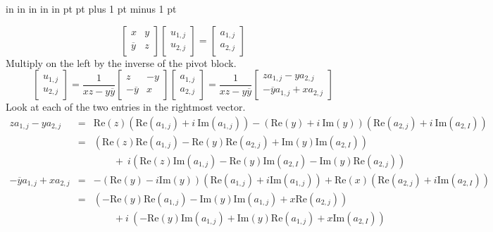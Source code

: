 %
%

 in
 in
 in
 in
 in
 pt
 pt plus 1 pt minus 1 pt

\newcommand{\bnd}{{\partial}}
\renewcommand{\Re}{{\mbox{Re}}}
\renewcommand{\Im}{{\mbox{Im}}}



\makeindex



$$
\left \lbrack \begin{array}{cc}
x & y \\
\overline{y} & z
\end{array} \right \rbrack
\left \lbrack \begin{array}{c}
u_{1,j} \\
u_{2,j}
\end{array} \right \rbrack
=
\left \lbrack \begin{array}{c}
a_{1,j} \\
a_{2,j}
\end{array} \right \rbrack
$$
Multiply on the left by the inverse of the pivot block.
$$
\left \lbrack \begin{array}{c}
u_{1,j} \\
u_{2,j}
\end{array} \right \rbrack
=
\frac{1}{xz - y\overline{y}}
\left \lbrack \begin{array}{cc}
z & -y \\
-\overline{y} & x
\end{array} \right \rbrack
\left \lbrack \begin{array}{c}
a_{1,j} \\
a_{2,j}
\end{array} \right \rbrack
=
\frac{1}{xz - y\overline{y}}
\left \lbrack \begin{array}{c}
z a_{1,j} - y a_{2,j} \\
- \overline{y} a_{1,j} + x a_{2,j}
\end{array} \right \rbrack
$$
Look at each of the two entries in the rightmost vector.
\begin{eqnarray*}
z a_{1,j} - y a_{2,j} 
& = & 
\Re(z) ( \Re(a_{1,j}) + i\  \Im(a_{1,j}) )
- ( \Re(y) + i\  \Im(y) )( \Re(a_{2,j}) + i\  \Im(a_{2,I}) )
\\
& = & 
( 
\Re(z) \Re(a_{1,j}) - \Re(y) \Re(a_{2,j}) + \Im(y) \Im(a_{2,I}) 
) \\
& & 
\qquad +\  i( 
\Re(z) \Im(a_{1,j}) - \Re(y) \Im(a_{2,I}) - \Im(y) \Re(a_{2,j})
)
\\
- \overline{y} a_{1,j} + x a_{2,j} 
& = &
-( \Re(y) - i \Im(y) ) ( \Re(a_{1,j}) + i \Im(a_{1,j}) )
+ \Re(x) ( \Re(a_{2,j}) + i \Im(a_{2,I}) )
\\
& = & 
(
-\Re(y) \Re(a_{1,j}) - \Im(y) \Im(a_{1,j}) + x \Re(a_{2,j})
) \\
& & 
\qquad + i\  (
-\Re(y) \Im(a_{1,j}) + \Im(y) \Re(a_{1,j}) + x \Im(a_{2,I})
)
\end{eqnarray*}
